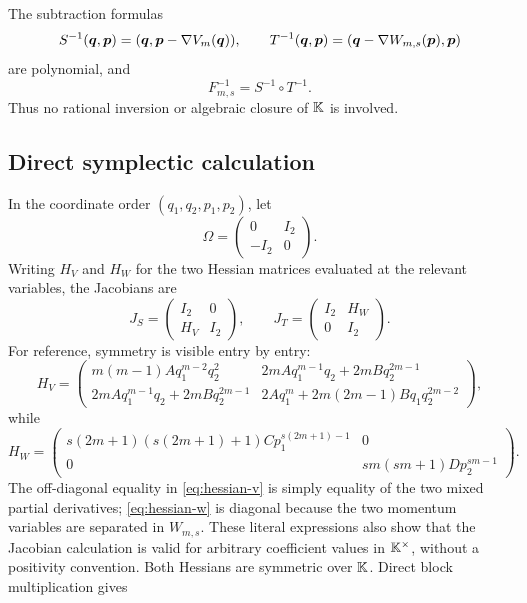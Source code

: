 \documentclass[11pt]{article}
\theoremstyle{definition}
\theoremstyle{remark}
\begin{document}
The subtraction formulas
\[
S^{-1}(\boldsymbol{q},\boldsymbol{p})=(\boldsymbol{q},\boldsymbol{p}-\nabla V_m(\boldsymbol{q})),
\qquad
T^{-1}(\boldsymbol{q},\boldsymbol{p})=(\boldsymbol{q}-\nabla W_{m,s}(\boldsymbol{p}),\boldsymbol{p})
\]
are polynomial, and
\[
F_{m,s}^{-1}=S^{-1}\circ T^{-1}.
\]
Thus no rational inversion or algebraic closure of \(\mathbb{K}\) is involved.

\subsection{Direct symplectic calculation}

In the coordinate order \((q_1,q_2,p_1,p_2)\), let
\[
\Omega=\begin{pmatrix}0&I_2\\-I_2&0\end{pmatrix}.
\]
Writing \(H_V\) and \(H_W\) for the two Hessian matrices evaluated at the
relevant variables, the Jacobians are
\[
J_S=\begin{pmatrix}I_2&0\\H_V&I_2\end{pmatrix},
\qquad
J_T=\begin{pmatrix}I_2&H_W\\0&I_2\end{pmatrix}.
\]
For reference, symmetry is visible entry by entry:
\begin{equation}
H_V=\begin{pmatrix}
m(m-1)Aq_1^{m-2}q_2^2
&2mAq_1^{m-1}q_2+2mBq_2^{2m-1}\\
2mAq_1^{m-1}q_2+2mBq_2^{2m-1}
&2Aq_1^m+2m(2m-1)Bq_1q_2^{2m-2}
\end{pmatrix},
\label{eq:hessian-v}
\end{equation}
while
\begin{equation}
H_W=\begin{pmatrix}
s(2m+1)(s(2m+1)+1)Cp_1^{s(2m+1)-1}&0\\
0&sm(sm+1)Dp_2^{sm-1}
\end{pmatrix}.
\label{eq:hessian-w}
\end{equation}
The off-diagonal equality in \eqref{eq:hessian-v} is simply equality of the
two mixed partial derivatives; \eqref{eq:hessian-w} is diagonal because the
two momentum variables are separated in \(W_{m,s}\).  These literal
expressions also show that the Jacobian calculation is valid for arbitrary
coefficient values in \(\mathbb{K}^\times\), without a positivity convention.
Both Hessians are symmetric over \(\mathbb{K}\).  Direct block multiplication gives
\end{document}
